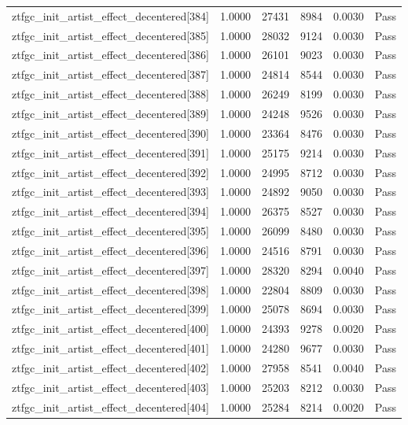 \begin{table}[htbp]
\begin{tabular}{llrrll}
ztfgc\_init\_artist\_effect\_decentered[384] & 1.0000 & 27431 & 8984 & 0.0030 & Pass \\
ztfgc\_init\_artist\_effect\_decentered[385] & 1.0000 & 28032 & 9124 & 0.0030 & Pass \\
ztfgc\_init\_artist\_effect\_decentered[386] & 1.0000 & 26101 & 9023 & 0.0030 & Pass \\
ztfgc\_init\_artist\_effect\_decentered[387] & 1.0000 & 24814 & 8544 & 0.0030 & Pass \\
ztfgc\_init\_artist\_effect\_decentered[388] & 1.0000 & 26249 & 8199 & 0.0030 & Pass \\
ztfgc\_init\_artist\_effect\_decentered[389] & 1.0000 & 24248 & 9526 & 0.0030 & Pass \\
ztfgc\_init\_artist\_effect\_decentered[390] & 1.0000 & 23364 & 8476 & 0.0030 & Pass \\
ztfgc\_init\_artist\_effect\_decentered[391] & 1.0000 & 25175 & 9214 & 0.0030 & Pass \\
ztfgc\_init\_artist\_effect\_decentered[392] & 1.0000 & 24995 & 8712 & 0.0030 & Pass \\
ztfgc\_init\_artist\_effect\_decentered[393] & 1.0000 & 24892 & 9050 & 0.0030 & Pass \\
ztfgc\_init\_artist\_effect\_decentered[394] & 1.0000 & 26375 & 8527 & 0.0030 & Pass \\
ztfgc\_init\_artist\_effect\_decentered[395] & 1.0000 & 26099 & 8480 & 0.0030 & Pass \\
ztfgc\_init\_artist\_effect\_decentered[396] & 1.0000 & 24516 & 8791 & 0.0030 & Pass \\
ztfgc\_init\_artist\_effect\_decentered[397] & 1.0000 & 28320 & 8294 & 0.0040 & Pass \\
ztfgc\_init\_artist\_effect\_decentered[398] & 1.0000 & 22804 & 8809 & 0.0030 & Pass \\
ztfgc\_init\_artist\_effect\_decentered[399] & 1.0000 & 25078 & 8694 & 0.0030 & Pass \\
ztfgc\_init\_artist\_effect\_decentered[400] & 1.0000 & 24393 & 9278 & 0.0020 & Pass \\
ztfgc\_init\_artist\_effect\_decentered[401] & 1.0000 & 24280 & 9677 & 0.0030 & Pass \\
ztfgc\_init\_artist\_effect\_decentered[402] & 1.0000 & 27958 & 8541 & 0.0040 & Pass \\
ztfgc\_init\_artist\_effect\_decentered[403] & 1.0000 & 25203 & 8212 & 0.0030 & Pass \\
ztfgc\_init\_artist\_effect\_decentered[404] & 1.0000 & 25284 & 8214 & 0.0020 & Pass \\

\end{tabular}
\end{table}

